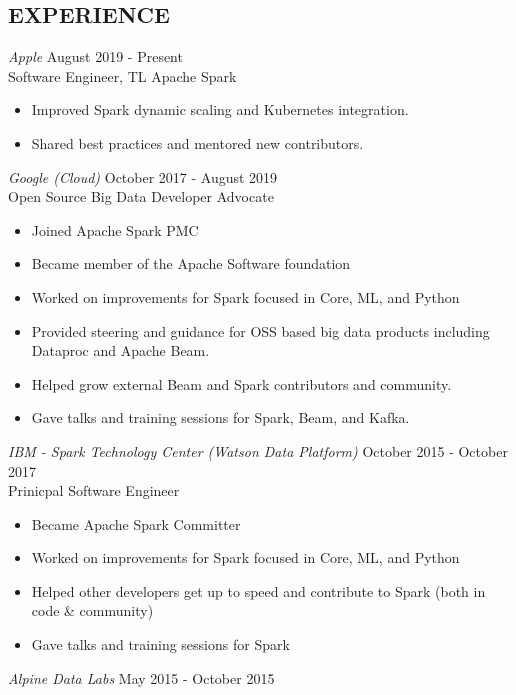 \documentclass[10pt,line,margin=0.1]{newsres}
\begin{document}
\begin{resume}
\section{EXPERIENCE}
        {\sl Apple} \hfill August 2019 - Present\\
        Software Engineer, TL Apache Spark
        \begin{itemize}  \itemsep -2pt %
          \item Improved Spark dynamic scaling and Kubernetes integration.
          \item Shared best practices and mentored new contributors.
        \end{itemize}                
        {\sl Google (Cloud)} \hfill October 2017 - August 2019\\
        Open Source Big Data Developer Advocate
        \begin{itemize}  \itemsep -2pt %
          \item Joined Apache Spark PMC
          \item Became member of the Apache Software foundation
          \item Worked on improvements for Spark focused in Core, ML, and Python
          \item Provided steering and guidance for OSS based big data products including Dataproc and Apache Beam.
          \item Helped grow external Beam and Spark contributors and community.
          \item Gave talks and training sessions for Spark, Beam, and Kafka.
        \end{itemize}
            {\sl IBM - Spark Technology Center (Watson Data Platform)} \hfill October 2015 - October 2017\\
        Prinicpal Software Engineer
        \begin{itemize}  \itemsep -2pt %
          \item Became Apache Spark Committer
          \item Worked on improvements for Spark focused in Core, ML, and Python
          \item Helped other developers get up to speed and contribute to Spark (both in code \& community)
          \item Gave talks and training sessions for Spark
        \end{itemize}
        {\sl Alpine Data Labs} \hfill May 2015 - October 2015\\

\end{resume}
\end{document}
